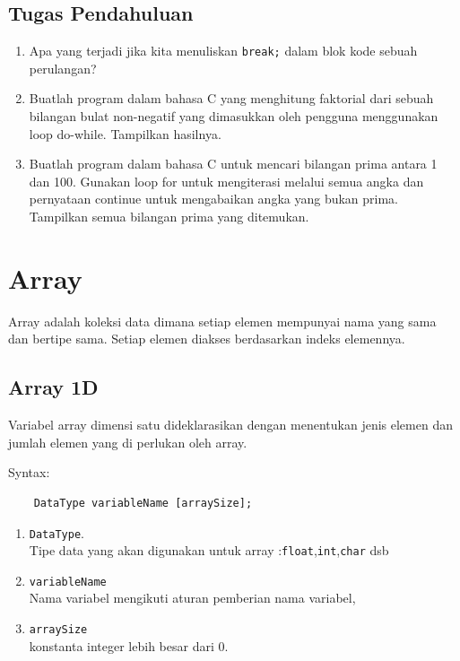 \subsection{Tugas Pendahuluan}
\begin{enumerate}
	\item Apa yang terjadi jika kita menuliskan \verb|break;| dalam blok kode sebuah perulangan?
	\item Buatlah program dalam bahasa C yang menghitung faktorial dari sebuah bilangan bulat non-negatif yang dimasukkan oleh pengguna menggunakan loop do-while. Tampilkan hasilnya.
	\item Buatlah program dalam bahasa C untuk mencari bilangan prima antara 1 dan 100. Gunakan loop for untuk mengiterasi melalui semua angka dan pernyataan continue untuk mengabaikan angka yang bukan prima. Tampilkan semua bilangan prima yang ditemukan.
\end{enumerate}

\section{Array}
Array adalah koleksi data dimana setiap elemen mempunyai nama yang sama dan bertipe sama. Setiap elemen diakses berdasarkan  indeks elemennya.
\subsection{Array 1D}
Variabel array dimensi satu dideklarasikan dengan menentukan jenis elemen dan jumlah elemen yang di perlukan oleh array.

Syntax:
\begin{verbatim}
    DataType variableName [arraySize];
\end{verbatim}
\begin{enumerate}
	\item \verb*|DataType|.\\
	      Tipe data yang akan digunakan untuk array :\verb*|float|,\verb*|int|,\verb*|char| dsb
	\item \verb*|variableName|\\
	      Nama variabel mengikuti aturan pemberian nama variabel,
	\item \verb*|arraySize| \\
	      konstanta integer lebih besar dari 0. \\
\end{enumerate}

